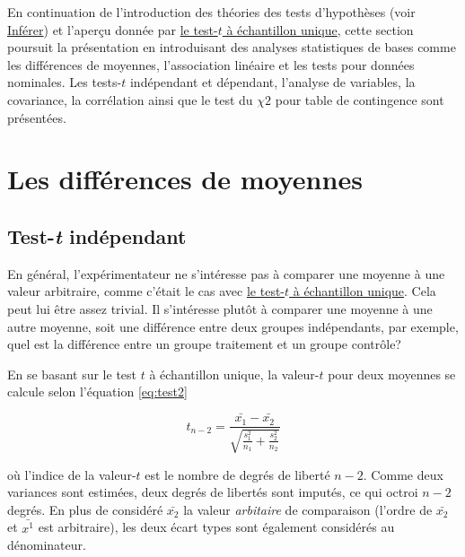 \documentclass[
]{book}
\begin{document}
En continuation de l'introduction des théories des tests d'hypothèses (voir \protect\hyperlink{infuxe9rer}{Inférer}) et l'aperçu donnée par \protect\hyperlink{le-test-t-uxe0-uxe9chantillon-unique}{le test-\(t\) à échantillon unique}, cette section poursuit la présentation en introduisant des analyses statistiques de bases comme les différences de moyennes, l'association linéaire et les tests pour données nominales. Les tests-\(t\) indépendant et dépendant, l'analyse de variables, la covariance, la corrélation ainsi que le test du \(\chi2\) pour table de contingence sont présentées.

\hypertarget{les-diffuxe9rences-de-moyennes}{%
\section{Les différences de moyennes}\label{les-diffuxe9rences-de-moyennes}}

\hypertarget{test-t-induxe9pendant}{%
\subsection{\texorpdfstring{Test-\emph{t} indépendant}{Test-t indépendant}}\label{test-t-induxe9pendant}}

En général, l'expérimentateur ne s'intéresse pas à comparer une moyenne à une valeur arbitraire, comme c'était le cas avec \protect\hyperlink{le-test-t-uxe0-uxe9chantillon-unique}{le test-\(t\) à échantillon unique}. Cela peut lui être assez trivial. Il s'intéresse plutôt à comparer une moyenne à une autre moyenne, soit une différence entre deux groupes indépendants, par exemple, quel est la différence entre un groupe traitement et un groupe contrôle?

En se basant sur le test \(t\) à échantillon unique, la valeur-\(t\) pour deux moyennes se calcule selon l'équation \eqref{eq:test2}

\begin{equation}
t_{n-2} = \frac{\bar{x_1}-\bar{x_2}}{\sqrt{\frac{s^2_{1}}{n_1}+\frac{s^2_{2}}{n_2}}}
\label{eq:test2}
\end{equation}

où l'indice de la valeur-\(t\) est le nombre de degrés de liberté \(n-2\). Comme deux variances sont estimées, deux degrés de libertés sont imputés, ce qui octroi \(n-2\) degrés. En plus de considéré \(\bar{x_2}\) la valeur \emph{arbitaire} de comparaison (l'ordre de \(\bar{x_2}\) et \(\bar{x^1}\) est arbitraire), les deux écart types sont également considérés au dénominateur.
\end{document}
